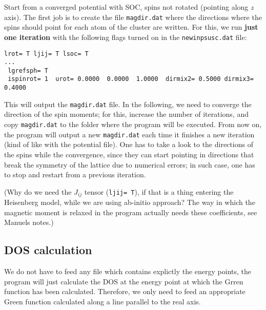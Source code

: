 \documentclass[11pt,fleqn]{book} %
\begin{document}
Start from a converged potential with SOC, spins not rotated (pointing along $z$ axis).
The first job is to create the file \verb|magdir.dat| where the directions where the spins
should point for each atom of the cluster are written.
For this, we run \textbf{just one iteration} with the following flags turned on
in the  \verb|newinpsusc.dat| file:
\begin{VBox}
\begin{verbatim}
lrot= T ljij= T lsoc= T
...
 lgrefsph= T
 ispinrot= 1  urot= 0.0000  0.0000  1.0000  dirmix2= 0.5000 dirmix3= 0.4000
\end{verbatim}
\end{VBox}
This will output the \verb|magdir.dat| file. In the following,
we need to converge the direction of the spin moments; for this,
increase the number of iterations, and copy \verb|magdir.dat| to the folder
where the program will be executed.
From now on, the program will output a new \verb|magdir.dat| each time it finishes a new
iteration (kind of like with the potential file). One has to take a look
to the directions of the spins while the convergence, since they can start
pointing in directions that break the symmetry of the lattice due to
numerical errors; in such case, one has to stop and restart from a previous iteration.


(Why do we need the $J_{ij}$ tensor (\verb|ljij= T|),
if that is a thing entering the Heisenberg model,
while we are using ab-initio approach? The way in which the magnetic moment
is relaxed in the program actually needs these coefficients, see Manuels notes.)

\subsection*{DOS calculation}

We do not have to feed any file which contains explictly the energy points,
the program will just calculate the DOS at the energy point at which
the Grren function has been calculated. Therefore, we only need to feed an
appropriate Green function calculated along a line parallel to the real axis.
\end{document}
